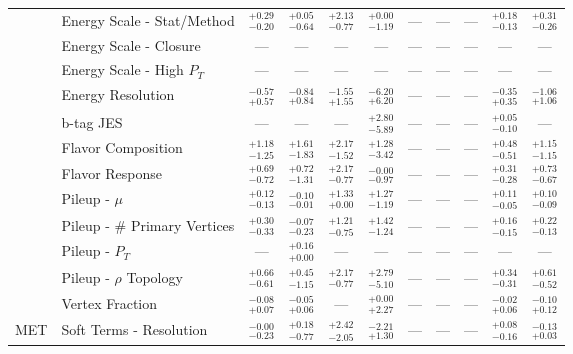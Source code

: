 \begin{tabular}{|cl||ccccccc|c||c|}
\cline{2-11}
&Energy Scale - Stat/Method &  $^{+0.29}_{-0.20}$  &  $^{+0.05}_{-0.64}$  &  $^{+2.13}_{-0.77}$  &  $^{+0.00}_{-1.19}$  & --- & --- & --- &  $^{+0.18}_{-0.13}$  &  $^{+0.31}_{-0.26}$ \\ 
\cline{2-11}
&Energy Scale - Closure & --- & --- & --- & --- & --- & --- & --- & --- & ---\\ 
\cline{2-11}
&Energy Scale - High $P_{T}$ & --- & --- & --- & --- & --- & --- & --- & --- & ---\\ 
\cline{2-11}
&Energy Resolution &  $^{-0.57}_{+0.57}$  &  $^{-0.84}_{+0.84}$  &  $^{-1.55}_{+1.55}$  &  $^{-6.20}_{+6.20}$  & --- & --- & --- &  $^{-0.35}_{+0.35}$  &  $^{-1.06}_{+1.06}$ \\ 
\cline{2-11}
&b-tag JES & --- & --- & --- &  $^{+2.80}_{-5.89}$  & --- & --- & --- &  $^{+0.05}_{-0.10}$  & ---\\ 
\cline{2-11}
&Flavor Composition &  $^{+1.18}_{-1.25}$  &  $^{+1.61}_{-1.83}$  &  $^{+2.17}_{-1.52}$  &  $^{+1.28}_{-3.42}$  & --- & --- & --- &  $^{+0.48}_{-0.51}$  &  $^{+1.15}_{-1.15}$ \\ 
\cline{2-11}
&Flavor Response &  $^{+0.69}_{-0.72}$  &  $^{+0.72}_{-1.31}$  &  $^{+2.17}_{-0.77}$  &  $^{-0.00}_{-0.97}$  & --- & --- & --- &  $^{+0.31}_{-0.28}$  &  $^{+0.73}_{-0.67}$ \\ 
\cline{2-11}
&Pileup - $\mu$ &  $^{+0.12}_{-0.13}$  &  $^{-0.10}_{-0.01}$  &  $^{+1.33}_{+0.00}$  &  $^{+1.27}_{-1.19}$  & --- & --- & --- &  $^{+0.11}_{-0.05}$  &  $^{+0.10}_{-0.09}$ \\ 
\cline{2-11}
&Pileup - \# Primary Vertices &  $^{+0.30}_{-0.33}$  &  $^{-0.07}_{-0.23}$  &  $^{+1.21}_{-0.75}$  &  $^{+1.42}_{-1.24}$  & --- & --- & --- &  $^{+0.16}_{-0.15}$  &  $^{+0.22}_{-0.13}$ \\ 
\cline{2-11}
&Pileup -  $P_{T}$ & --- &  $^{+0.16}_{+0.00}$  & --- & --- & --- & --- & --- & --- & ---\\ 
\cline{2-11}
&Pileup - $\rho$ Topology &  $^{+0.66}_{-0.61}$  &  $^{+0.45}_{-1.15}$  &  $^{+2.17}_{-0.77}$  &  $^{+2.79}_{-5.10}$  & --- & --- & --- &  $^{+0.34}_{-0.31}$  &  $^{+0.61}_{-0.52}$ \\ 
\cline{2-11}
&Vertex Fraction &  $^{-0.08}_{+0.07}$  &  $^{-0.05}_{+0.06}$  & --- &  $^{+0.00}_{+2.27}$  & --- & --- & --- &  $^{-0.02}_{+0.06}$  &  $^{-0.10}_{+0.12}$ \\ 
\hline
\multirow{2}{*}{MET}
&Soft Terms - Resolution &  $^{-0.00}_{-0.23}$  &  $^{+0.18}_{-0.77}$  &  $^{+2.42}_{-2.05}$  &  $^{-2.21}_{+1.30}$  & --- & --- & --- &  $^{+0.08}_{-0.16}$  &  $^{-0.13}_{+0.03}$ \\ 

\end{tabular}
